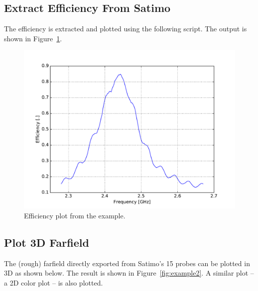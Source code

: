 \documentclass[10pt]{article}
\begin{document}
\clearpage
\subsection{Extract Efficiency From Satimo}

The efficiency is extracted and plotted using the following script. The output is shown in Figure~\ref{fig:example1}.

\begin{figure}[htbp]
    \centering
    \includegraphics[scale=0.5]{examples/ex1_efficiency.pdf} 
    \caption{Efficiency plot from the example.}
    \label{fig:example1}
\end{figure}

\clearpage
\subsection{Plot 3D Farfield}

The (rough) farfield directly exported from Satimo's 15 probes can be plotted in 3D as shown below. The result is shown in Figure~\ref{fig:example2}. A similar plot -- a 2D color plot -- is also plotted.
\end{document}
